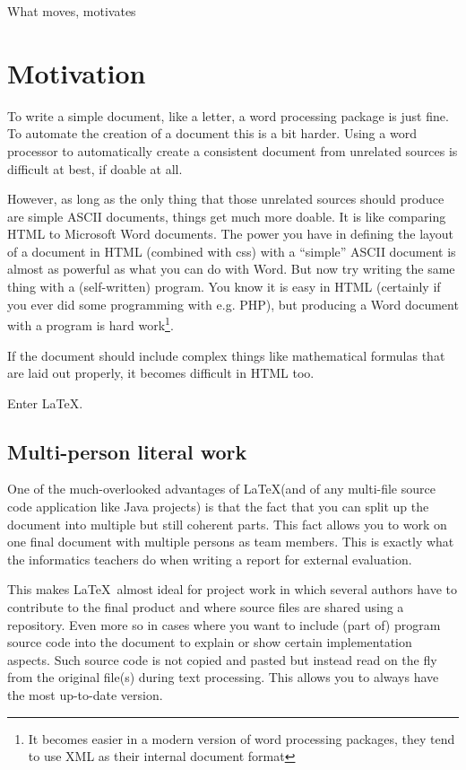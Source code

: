 \renewcommand\TheFile{ch02_motivates.tex}

\begin{savequote}[15cm]
  \vspace{-30mm}
  \raggedleft
  \sffamily
  What moves, motivates
\end{savequote}
\chapter{Motivation}
To write a simple document, like a letter, a word processing package 
is just fine.
To automate the creation of a document this is a bit harder. 
Using a word processor to automatically create a consistent document from 
unrelated sources is difficult at best, if doable at all.

However, as long as the only thing that those unrelated sources should
produce are simple ASCII documents, things get much more
doable. It is like comparing HTML to Microsoft Word documents. The power
you have in defining the layout of a document in HTML (combined with
css) with a ``simple'' ASCII document is almost as powerful as what you
can do with Word. But now try writing the same thing with a (self-written) program. You know it is easy in HTML (certainly if you ever
did some programming with e.g. PHP), but producing a Word document with
a program is hard work\footnote{It becomes easier in a modern version of
word processing packages, they tend to use XML as their internal document format}. 

If the document should include complex things like mathematical
formulas that are laid out properly, it becomes difficult in HTML too.

Enter \LaTeX.

\section{Multi-person literal work}
One of the much-overlooked advantages of \LaTeX (and of any multi-file
source code application like Java projects) is that the fact that you
can split up the document into multiple but still coherent parts.
This fact allows you to work on one final document with multiple
persons as team members. This is exactly what the informatics teachers do when writing a report for external evaluation.

This makes \LaTeX\ almost ideal for project work in which several
authors have to contribute to the final product and where source files
are shared using a repository. Even more so in
cases where you want to include (part of) program source code
into the document to explain or show certain implementation
aspects. Such source code is not copied and pasted but instead read
on the fly from the original file(s) during text processing. This
allows you to always have the most up-to-date version.

